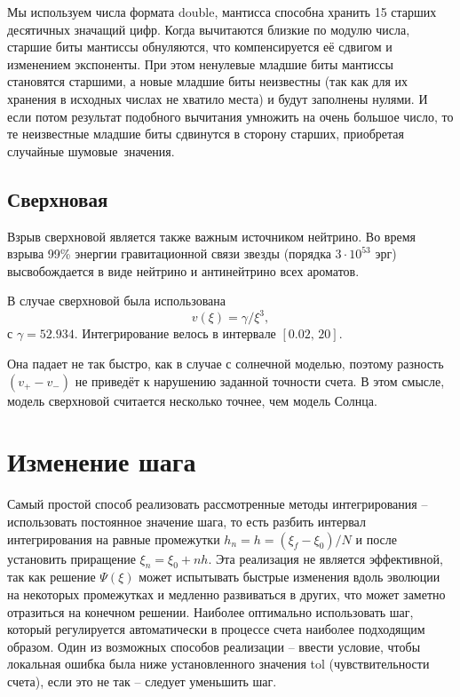 \documentclass[12pt]{article}
\numberwithin{equation}{section}
\begin{document}
Мы используем числа формата double, мантисса способна хранить 15 старших десятичных значащий цифр. Когда вычитаются близкие по модулю числа, старшие биты мантиссы обнуляются, что компенсируется её сдвигом и изменением экспоненты. При этом ненулевые младшие биты мантиссы становятся старшими, а новые младшие биты неизвестны (так как для их хранения в исходных числах не хватило места) и будут заполнены нулями. И если потом результат подобного вычитания умножить на очень большое число, то те неизвестные младшие биты сдвинутся в сторону старших, приобретая случайные \glqq шумовые\grqq $\,$ значения.

\subsection{Сверхновая}

Взрыв сверхновой является также важным источником нейтрино. Во время взрыва 99\% энергии гравитационной связи звезды (порядка $3\cdot10^53$ эрг) высвобождается в виде нейтрино и антинейтрино всех ароматов.

В случае сверхновой была использована
\begin{equation}
v(\xi)=\gamma/\xi^3,
\end{equation}
с $\gamma=52.934$. Интегрирование велось в интервале $[0.02,\,20]$.

Она падает не так быстро, как в случае с солнечной моделью, поэтому разность $(v_+-v_-)$ не приведёт к нарушению заданной точности счета. В этом смысле, модель сверхновой считается несколько точнее, чем модель Солнца.


\section{Изменение шага}

Самый простой способ реализовать рассмотренные методы интегрирования -- использовать постоянное значение шага, то есть разбить интервал интегрирования на равные промежутки $h_n=h=(\xi_f-\xi_0)/N$ и после установить приращение $\xi_n=\xi_0+nh$. Эта реализация не является эффективной, так как решение $\Psi(\xi)$ может испытывать быстрые изменения вдоль эволюции на некоторых промежутках и медленно развиваться в других, что может заметно отразиться на конечном решении. Наиболее оптимально использовать шаг, который регулируется автоматически в процессе счета наиболее подходящим образом.
Один из возможных способов реализации -- ввести условие, чтобы локальная ошибка была ниже установленного значения tol (чувствительности счета), если это не так -- следует уменьшить шаг.
\end{document}
